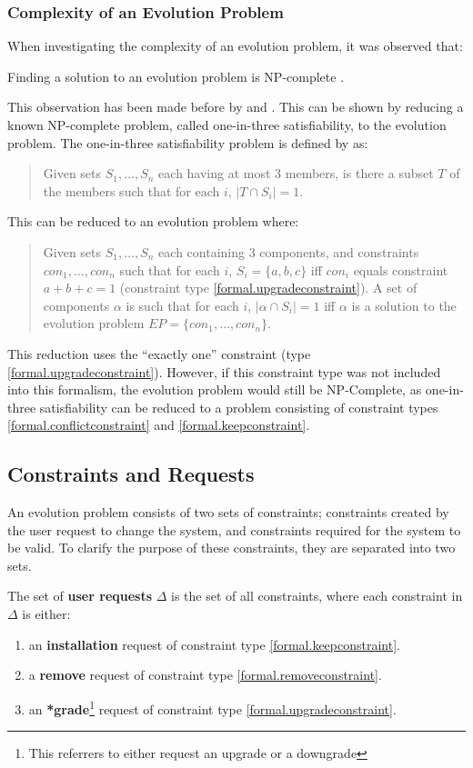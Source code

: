 \subsubsection{Complexity of an Evolution Problem}
When investigating the complexity of an evolution problem, it was observed that:
\begin{obs}
Finding a solution to an evolution problem is NP-complete \citep{cook1971}.
\end{obs}
This observation has been made before by \cite{Mancinelli2006} and \cite{abate2011}.
This can be shown by reducing a known NP-complete problem, called one-in-three satisfiability, to the evolution problem.
The one-in-three satisfiability problem is defined by \cite{Schaefer1978} as:
\begin{quote}
Given sets $S_1, \ldots, S_n$ each having at most 3 members, is there a subset $T$ of the members such that for each $i$, $|T \cap S_i|  =  1$.
\end{quote}

This can be reduced to an evolution problem where:
\begin{quote}
Given sets $S_1, \ldots, S_n$ each containing 3 components, and constraints $con_1,\ldots,con_n$
such that for each $i$, $S_i = \{a,b,c\}$ iff $con_i$ equals constraint $a + b + c = 1$ (constraint type \ref{formal.upgradeconstraint}).
A set of components $\alpha$ is such that for each $i$, $|\alpha \cap S_i|  =  1$ iff $\alpha$ is a solution to the evolution problem $EP = \{con_1,\ldots,con_n\}$.
\end{quote}

This reduction uses the ``exactly one'' constraint (type \ref{formal.upgradeconstraint}).
However, if this constraint type was not included into this formalism, the evolution problem would still be NP-Complete,
as one-in-three satisfiability can be reduced to a problem consisting of  constraint types \ref{formal.conflictconstraint} and \ref{formal.keepconstraint}.

\subsection{Constraints and Requests}
\label{formal.constraints}
An evolution problem consists of two sets of constraints; constraints created by the user request to change the system, 
and constraints required for the system to be valid.
To clarify the purpose of these constraints, they are separated into two sets.

\begin{defs}
The set of \textbf{user requests} $\Delta$ is the set of all constraints, where each constraint in $\Delta$ is either:
\begin{enumerate}
  \item an \textbf{installation} request of constraint type \ref{formal.keepconstraint}.
  \item a \textbf{remove} request of constraint type \ref{formal.removeconstraint}.
  \item an \textbf{*grade}\footnote{This referrers to either request an upgrade or a downgrade} request of constraint type \ref{formal.upgradeconstraint}.
\end{enumerate}
\end{defs}

